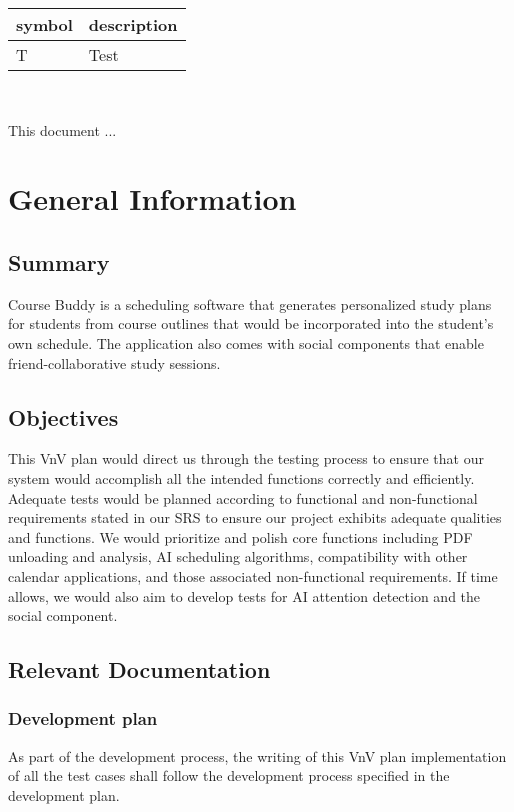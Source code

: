 \documentclass[12pt, titlepage]{article}
\begin{document}
\renewcommand{\arraystretch}{1.2}
\begin{tabular}{l l} 
  \toprule		
  \textbf{symbol} & \textbf{description}\\
  \midrule 
  T & Test\\
  \bottomrule
\end{tabular}\\




\newpage


This document ... 

\section{General Information}

\subsection{Summary}
Course Buddy is a scheduling software that generates personalized study plans for students from course outlines that would be incorporated into the student's own schedule.  The application also comes with social components that enable friend-collaborative study sessions.

\subsection{Objectives}
This VnV plan would direct us through the testing process to ensure that our system would accomplish all the intended functions correctly and efficiently.  
Adequate tests would be planned according to functional and non-functional requirements stated in our SRS to ensure our project exhibits adequate qualities and functions.
We would prioritize and polish core functions including PDF unloading and analysis, AI scheduling algorithms, compatibility with other calendar applications, and those associated non-functional requirements. If time allows, we would also aim to develop tests for AI attention detection and the social component.


\subsection{Relevant Documentation}
\subsubsection{Development plan}
As part of the development process, the writing of this VnV plan implementation of all the test cases shall follow the development process specified in the development plan.
\end{document}
